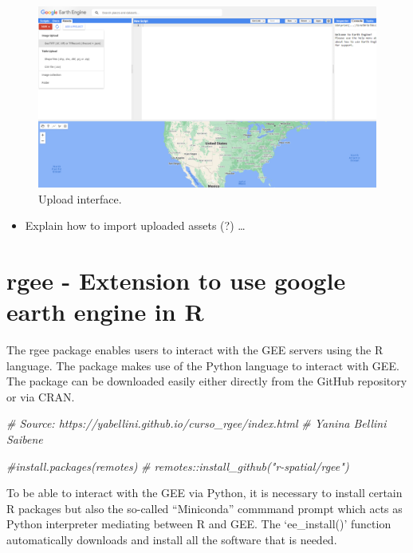 \documentclass[
  10pt,
  b5paper,
  oneside]{book}
\newenvironment{Shaded}{\begin{snugshade}}{\end{snugshade}}
\newcommand{\CommentTok}[1]{\textcolor[rgb]{0.56,0.35,0.01}{\textit{#1}}}
\providecommand{\tightlist}{%
  \setlength{\itemsep}{0pt}\setlength{\parskip}{0pt}}
\begin{document}
\begin{figure}
\includegraphics[width=12cm]{images/2.2_upload-assets-2} \caption{Upload interface.}\label{fig:unnamed-chunk-3}
\end{figure}

\begin{itemize}
\tightlist
\item
  Explain how to import uploaded assets (?) \ldots{}
\end{itemize}

\hypertarget{rgee---extension-to-use-google-earth-engine-in-r}{%
\section{rgee - Extension to use google earth engine in R}\label{rgee---extension-to-use-google-earth-engine-in-r}}

The rgee package enables users to interact with the GEE servers using the R language. The package makes use of the Python language to interact with GEE. The package can be downloaded easily either directly from the GitHub repository or via CRAN.

\begin{Shaded}
\begin{Highlighting}[]
\CommentTok{\# Source: https://yabellini.github.io/curso\_rgee/index.html}
\CommentTok{\# Yanina Bellini Saibene}

\CommentTok{\#install.packages(\textquotesingle{}remotes\textquotesingle{})}
\CommentTok{\# remotes::install\_github("r{-}spatial/rgee")}
\end{Highlighting}
\end{Shaded}

To be able to interact with the GEE via Python, it is necessary to install certain R packages but also the so-called ``Miniconda'' commmand prompt which acts as Python interpreter mediating between R and GEE. The `ee\_install()' function automatically downloads and install all the software that is needed.
\end{document}
